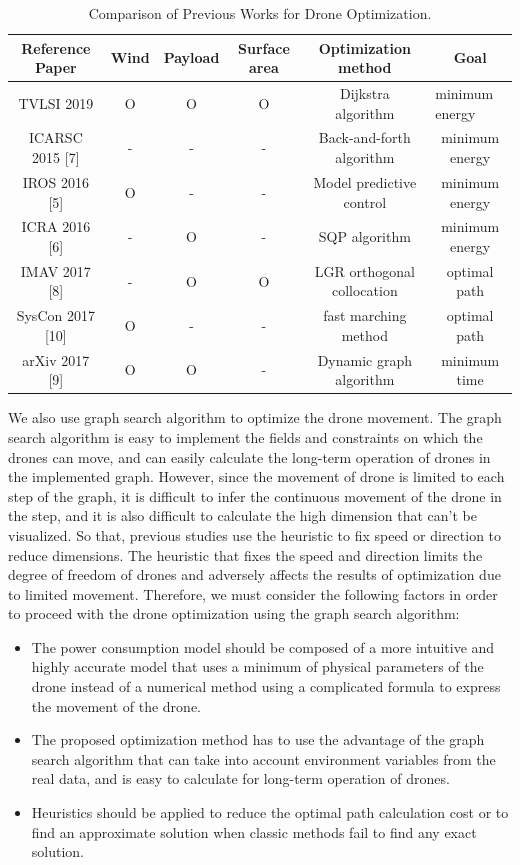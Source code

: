 \documentclass[journal]{./template/IEEEtran}
\begin{document}
\begin{table}[ht]
\caption{Comparison of Previous Works for Drone Optimization.}
\label{Table: survay_result}
\centering
\begin{tabular}{|c|c|c|c|c|c|}
\hline
Reference Paper & Wind & Payload & Surface area & Optimization method & Goal \\ \hline
TVLSI 2019 & O & O & O & Dijkstra algorithm & \multicolumn{1}{l|}{minimum energy} \\ \hline
ICARSC 2015 {[}7{]} & - & - & - & Back-and-forth algorithm & minimum energy \\ \hline
IROS 2016 {[}5{]} & O  & - & - & Model predictive control & minimum energy \\ \hline
ICRA 2016 {[}6{]} & - & O & - & SQP algorithm & minimum energy \\ \hline
IMAV 2017 {[}8{]} & - & O & O & LGR orthogonal collocation & optimal path \\ \hline
SysCon 2017 {[}10{]} & O & - & - & fast marching method & optimal path \\ \hline
arXiv 2017 {[}9{]} & O & O & - & Dynamic graph algorithm & minimum time \\ \hline
\end{tabular}
\end{table}

We also use graph search algorithm to optimize the drone movement. The graph search algorithm is easy to implement the fields and constraints on which the drones can move, and can easily calculate the long-term operation of drones in the implemented graph.
However, since the movement of drone is limited to each step of the graph, it is difficult to infer the continuous movement of the drone in the step, and it is also difficult to calculate the high dimension that can’t be visualized.
So that, previous studies use the heuristic to fix speed or direction to reduce dimensions.
The heuristic that fixes the speed and direction limits the degree of freedom of drones and adversely affects the results of optimization due to limited movement.
Therefore, we must consider the following factors in order to proceed with the drone optimization using the graph search algorithm: 
\begin{itemize}
    \item The power consumption model should be composed of a more intuitive and highly accurate model that uses a minimum of physical parameters of the drone instead of a numerical method using a complicated formula to express the movement of the drone.
    \item The proposed optimization method has to use the advantage of the graph search algorithm that can take into account environment variables from the real data, and is easy to calculate for long-term operation of drones.
    \item Heuristics should be applied to reduce the optimal path calculation cost or to find an approximate solution when classic methods fail to find any exact solution.
\end{itemize}
\end{document}
